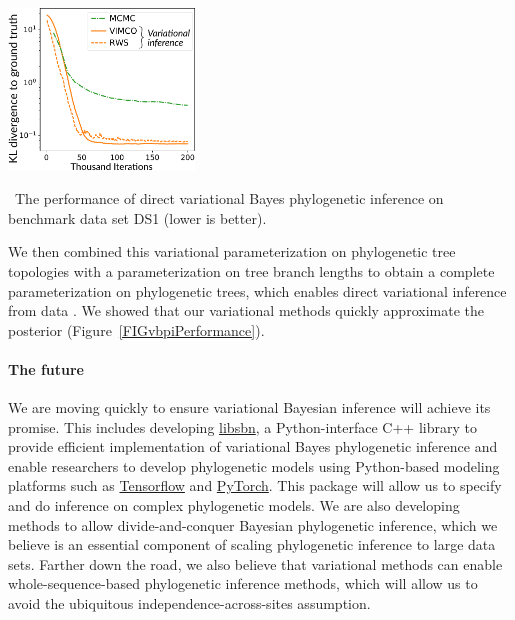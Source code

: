 \documentclass[nobib]{tufte-handout}
\begin{document}
\begin{marginfigure}[0.7in]%
  \includegraphics[width=1.95in]{vbpi-performance}
  \caption{\
    The performance of direct variational Bayes phylogenetic inference on benchmark data set DS1 (lower is better).
    }
  \label{FIGvbpiPerformance}
\end{marginfigure}%

We then combined this variational parameterization on phylogenetic tree topologies with a parameterization on tree branch lengths to obtain a complete parameterization on phylogenetic trees, which enables direct variational inference from data \cite{Zhang2018-lw}.
We showed that our variational methods quickly approximate the posterior (Figure~\ref{FIGvbpiPerformance}).

\paragraph{The future}
We are moving quickly to ensure variational Bayesian inference will achieve its promise.
This includes developing \href{https://github.com/matsengrp/libsbn/}{libsbn}, a Python-interface C++ library to provide efficient implementation of variational Bayes phylogenetic inference and enable researchers to develop phylogenetic models using Python-based modeling platforms such as \href{https://www.tensorflow.org/}{Tensorflow} and \href{https://pytorch.org/}{PyTorch}.
This package will allow us to specify and do inference on complex phylogenetic models.
We are also developing methods to allow divide-and-conquer Bayesian phylogenetic inference, which we believe is an essential component of scaling phylogenetic inference to large data sets.
Farther down the road, we also believe that variational methods can enable whole-sequence-based phylogenetic inference methods, which will allow us to avoid the ubiquitous independence-across-sites assumption.

\newpage


\end{document}
